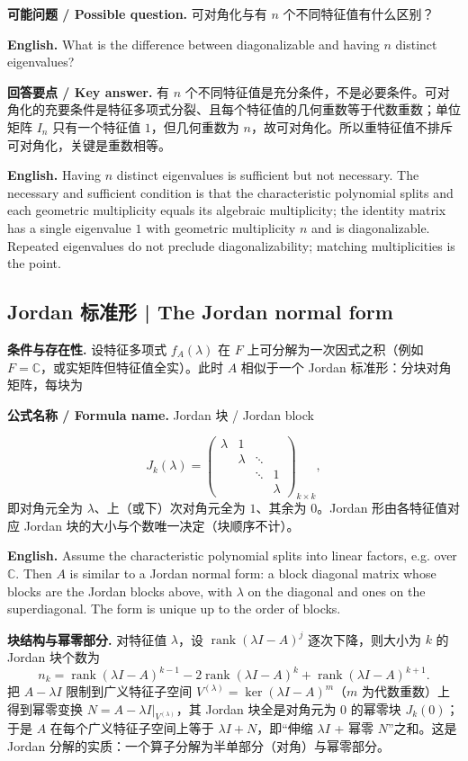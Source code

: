 \documentclass[UTF8,11pt,a4paper]{ctexart}
\newcommand{\EN}[1]{\par\noindent\textbf{English.} #1\par}
\newcommand{\FORMULA}[2]{\par\noindent\textbf{公式名称 / Formula name.} #1 / #2\par}
\newcommand{\ASK}[4]{\par\noindent\textbf{可能问题 / Possible question.} #1\par\EN{#2}\noindent\textbf{回答要点 / Key answer.} #3\par\EN{#4}\medskip}
\begin{document}
\ASK{可对角化与有 $n$ 个不同特征值有什么区别？}{What is the difference between diagonalizable and having $n$ distinct eigenvalues?}{有 $n$ 个不同特征值是充分条件，不是必要条件。可对角化的充要条件是特征多项式分裂、且每个特征值的几何重数等于代数重数；单位矩阵 $I_n$ 只有一个特征值 $1$，但几何重数为 $n$，故可对角化。所以重特征值不排斥可对角化，关键是重数相等。}{Having $n$ distinct eigenvalues is sufficient but not necessary. The necessary and sufficient condition is that the characteristic polynomial splits and each geometric multiplicity equals its algebraic multiplicity; the identity matrix has a single eigenvalue $1$ with geometric multiplicity $n$ and is diagonalizable. Repeated eigenvalues do not preclude diagonalizability; matching multiplicities is the point.}

\subsection{Jordan 标准形 | The Jordan normal form}
\noindent\textbf{条件与存在性.} 设特征多项式 $f_A(\lambda)$ 在 $F$ 上可分解为一次因式之积（例如 $F=\mathbb C$，或实矩阵但特征值全实）。此时 $A$ 相似于一个 Jordan 标准形：分块对角矩阵，每块为
\FORMULA{Jordan 块}{Jordan block}
\[
J_k(\lambda)=\begin{pmatrix}
\lambda&1&&\\[-2pt]
&\lambda&\ddots&\\[-2pt]
&&\ddots&1\\
&&&\lambda
\end{pmatrix}_{k\times k},
\]
即对角元全为 $\lambda$、上（或下）次对角元全为 $1$、其余为 $0$。Jordan 形由各特征值对应 Jordan 块的大小与个数唯一决定（块顺序不计）。
\EN{Assume the characteristic polynomial splits into linear factors, e.g. over $\mathbb C$. Then $A$ is similar to a Jordan normal form: a block diagonal matrix whose blocks are the Jordan blocks above, with $\lambda$ on the diagonal and ones on the superdiagonal. The form is unique up to the order of blocks.}
\noindent\textbf{块结构与幂零部分.} 对特征值 $\lambda$，设 $\operatorname{rank}(\lambda I-A)^j$ 逐次下降，则大小为 $k$ 的 Jordan 块个数为
\[
n_k=\operatorname{rank}(\lambda I-A)^{k-1}-2\operatorname{rank}(\lambda I-A)^k+\operatorname{rank}(\lambda I-A)^{k+1}.
\]
把 $A-\lambda I$ 限制到广义特征子空间 $V^{(\lambda)}=\ker(\lambda I-A)^{m}$（$m$ 为代数重数）上得到幂零变换 $N=A-\lambda I|_{V^{(\lambda)}}$，其 Jordan 块全是对角元为 $0$ 的幂零块 $J_k(0)$；于是 $A$ 在每个广义特征子空间上等于 $\lambda I+N$，即“伸缩 $\lambda I$ + 幂零 $N$”之和。这是 Jordan 分解的实质：一个算子分解为半单部分（对角）与幂零部分。
\end{document}
